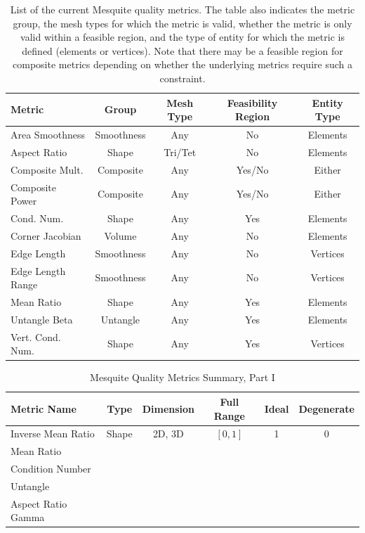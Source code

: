 \documentclass[letter]{report}
\begin{document}
\begin{table}[htb]
\begin{center}
\begin{tabular}{|l|c|c|c|c|}
\hline
Metric & Group & Mesh Type & Feasibility Region &Entity Type\\
\hline
Area Smoothness &Smoothness & Any & No & Elements\\
Aspect Ratio & Shape &Tri/Tet & No & Elements\\
Composite Mult. & Composite &Any& Yes/No & Either\\
Composite Power & Composite &Any& Yes/No & Either\\
Cond. Num.& Shape & Any & Yes & Elements \\
Corner Jacobian & Volume & Any & No & Elements \\
Edge Length &Smoothness & Any & No & Vertices \\
Edge Length Range & Smoothness & Any &No & Vertices\\
Mean Ratio &Shape & Any & Yes &Elements\\
Untangle Beta &Untangle &Any&Yes&Elements\\
Vert. Cond. Num.& Shape & Any & Yes & Vertices\\
\hline
\end{tabular}
\label{current-metrics}
\caption{List of the current Mesquite quality metrics. The table also
indicates the metric group, the mesh types for which the metric is
valid, whether the metric is only valid within a feasible
region, and the type of entity for which the metric is defined (elements
or vertices).  Note that there may be a feasible region for composite
metrics depending on whether the underlying metrics require such a
constraint.}
\end{center}
\end{table}


\begin{table}[h]
\begin{center}
\begin{tabular}{|l|c|c|c|c|c|}
\hline
Metric Name & Type & Dimension & Full Range & Ideal & Degenerate \\ \hline
Inverse Mean Ratio & Shape & 2D, 3D & $[0,1]$ & 1 & 0 \\ 
Mean Ratio &  &  &  &  &  \\ 
Condition Number &  &  &  &  &  \\ 
Untangle &  &  &  &  &  \\ 
Aspect Ratio Gamma &  &  &  &  &  \\ 
\hline
\end{tabular}
\caption{\label{QualityMetrics1} Mesquite Quality Metrics Summary, Part I}
\end{center}
\end{table}
\end{document}
